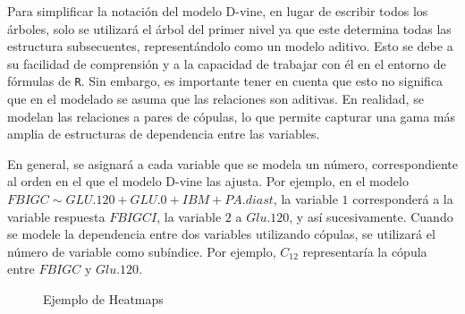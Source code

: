 Para simplificar la notación del modelo D-vine, en lugar de escribir todos los árboles, solo se utilizará el árbol del primer nivel ya que este determina todas las estructura subsecuentes, representándolo como un modelo aditivo. Esto se debe a su facilidad de comprensión y a la capacidad de trabajar con él en el entorno de fórmulas de \texttt{R}. Sin embargo, es importante tener en cuenta que esto no significa que en el modelado se asuma que las relaciones son aditivas. En realidad, se modelan las relaciones a pares de cópulas, lo que permite capturar una gama más amplia de estructuras de dependencia entre las variables.

En general, se asignará a cada variable que se modela un número, correspondiente al orden en el que el modelo D-vine las ajusta. Por ejemplo, en el modelo $FBIGC \sim GLU.120 + GLU.0 + IBM + PA.diast$, la variable $1$ corresponderá a la variable respuesta $FBIGCI$, la variable $2$ a $Glu.120$, y así sucesivamente. Cuando se modele la dependencia entre dos variables utilizando cópulas, se utilizará el número de variable como subíndice. Por ejemplo, $C_{12}$ representaría la cópula entre $FBIGC$ y $Glu.120$.


\begin{figure}[H]
 \centering
    \caption{Ejemplo de Heatmaps}
    \label{heatEj}
\end{figure}

